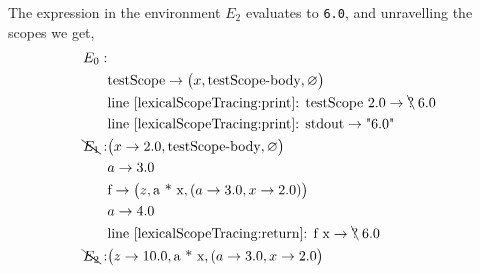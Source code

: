 The expression in the environment $E_2$ evaluates to \lstinline!6.0!, and unravelling the scopes we get,
\begin{align*}
  E_0:&\\
      &\text{testScope} \rightarrow \big(x, \text{testScope-body}, \varnothing\big)\\
      & \text{line~\ref{lexicalScopeTracing:print}: testScope 2.0} \rightarrow \bcancel{\text{?}}\; 6.0\\
      & \text{line~\ref{lexicalScopeTracing:print}: stdout} \rightarrow \text{"6.0"}\\
  \bcancel{E_1}: & \big(x\rightarrow 2.0, \text{testScope-body}, \varnothing\big)\\
      & a \rightarrow 3.0\\
      & \text{f} \rightarrow \big(z, \text{a * x}, (a \rightarrow 3.0, x\rightarrow 2.0)\big)\\
      & a \rightarrow 4.0 \\
      & \text{line~\ref{lexicalScopeTracing:return}: f x} \rightarrow \bcancel{\text{?}}\; 6.0\\
  \bcancel{E_2}: & \big(z \rightarrow 10.0, \text{a * x}, (a \rightarrow 3.0, x\rightarrow 2.0\big)\\
\end{align*}

